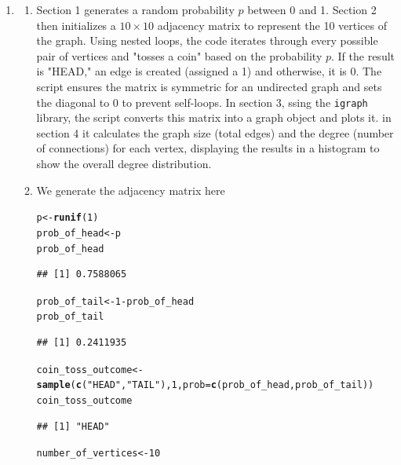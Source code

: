 \documentclass[11pt]{article}\usepackage[]{graphicx}\usepackage[dvipsnames]{xcolor}
\makeatletter
\newcommand{\hlnum}[1]{\textcolor[rgb]{0.686,0.059,0.569}{#1}}%
\newcommand{\hlsng}[1]{\textcolor[rgb]{0.192,0.494,0.8}{#1}}%
\newcommand{\hlopt}[1]{\textcolor[rgb]{0,0,0}{#1}}%
\newcommand{\hldef}[1]{\textcolor[rgb]{0.345,0.345,0.345}{#1}}%
\newcommand{\hlkwb}[1]{\textcolor[rgb]{0.69,0.353,0.396}{#1}}%
\newcommand{\hlkwc}[1]{\textcolor[rgb]{0.333,0.667,0.333}{#1}}%
\newcommand{\hlkwd}[1]{\textcolor[rgb]{0.737,0.353,0.396}{\textbf{#1}}}%
\newenvironment{kframe}{%
 \def\at@end@of@kframe{}%
 \ifinner\ifhmode%
  \def\at@end@of@kframe{\end{minipage}}%
  \begin{minipage}{\columnwidth}%
 \fi\fi%
 \def\FrameCommand##1{\hskip\@totalleftmargin \hskip-\fboxsep
 \colorbox{shadecolor}{##1}\hskip-\fboxsep
     \hskip-\linewidth \hskip-\@totalleftmargin \hskip\columnwidth}%
 \MakeFramed {\advance\hsize-\width
   \@totalleftmargin\z@ \linewidth\hsize
   \@setminipage}}%
 {\par\unskip\endMakeFramed%
 \at@end@of@kframe}
\newenvironment{knitrout}{}{} %
\theoremstyle{problemstyle}
\makeatother
\begin{document}
\begin{enumerate}[label=\arabic*.]
    \item
    \begin{enumerate}[label=(\alph*)]
        \item Section 1 generates a random probability $p$ between 0 and 1. 
        Section 2 then initializes a $10 \times 10$ adjacency matrix to represent the 10 vertices of the graph. 
        Using nested loops, the code iterates through every possible pair of vertices and "tosses a coin" based on the probability $p$. If the result is "HEAD," an edge is created (assigned a 1) and otherwise, it is 0. 
        The script ensures the matrix is symmetric for an undirected graph and sets the diagonal to 0 to prevent self-loops.
        In section 3, ssing the \texttt{igraph} library, the script converts this matrix into a graph object and plots it. 
        in section 4 it calculates the graph size (total edges) and the degree (number of connections) for each vertex, displaying the results in a histogram to show the overall degree distribution.
        \item We generate the adjacency matrix here
\begin{knitrout}
\color{fgcolor}\begin{kframe}
\begin{alltt}
\hldef{p} \hlkwb{<-} \hlkwd{runif}\hldef{(}\hlnum{1}\hldef{)}
\hldef{prob_of_head} \hlkwb{<-} \hldef{p}
\hldef{prob_of_head}
\end{alltt}
\begin{verbatim}
## [1] 0.7588065
\end{verbatim}
\begin{alltt}
\hldef{prob_of_tail} \hlkwb{<-} \hlnum{1}\hlopt{-}\hldef{prob_of_head}
\hldef{prob_of_tail}
\end{alltt}
\begin{verbatim}
## [1] 0.2411935
\end{verbatim}
\begin{alltt}
\hldef{coin_toss_outcome} \hlkwb{<-} \hlkwd{sample}\hldef{(}\hlkwd{c}\hldef{(}\hlsng{"HEAD"}\hldef{,}\hlsng{"TAIL"}\hldef{),} \hlnum{1}\hldef{,} \hlkwc{prob} \hldef{=} \hlkwd{c}\hldef{(prob_of_head, prob_of_tail) )}
\hldef{coin_toss_outcome}
\end{alltt}
\begin{verbatim}
## [1] "HEAD"
\end{verbatim}
\begin{alltt}
    \hldef{number_of_vertices}\hlkwb{<-} \hlnum{10}

\end{alltt}
\end{kframe}
\end{knitrout}
\end{enumerate}
\end{enumerate}
\end{document}
